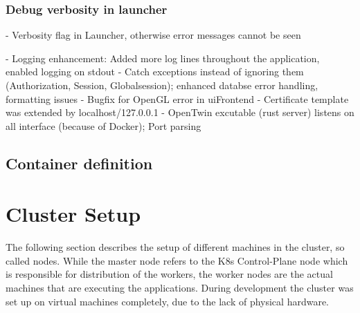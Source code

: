 \subsubsection*{Debug verbosity in launcher}
- Verbosity flag in Launcher, otherwise error messages cannot be seen


- Logging enhancement: Added more log lines throughout the application, enabled logging on stdout
- Catch exceptions instead of ignoring them (Authorization, Session, Globalsession); enhanced databse error handling, formatting issues
- Bugfix for OpenGL error in uiFrontend
- Certificate template was extended by localhost/127.0.0.1
- OpenTwin excutable (rust server) listens on all interface (because of Docker); Port parsing


\subsection{Container definition}









\section{Cluster Setup}
The following section describes the setup of different machines in the cluster, so called nodes. While the master node refers to the \ac{K8s} Control-Plane node which is responsible for distribution of the workers, the worker nodes are the actual machines that are executing the applications. During development the cluster was set up on virtual machines completely, due to the lack of physical hardware.


